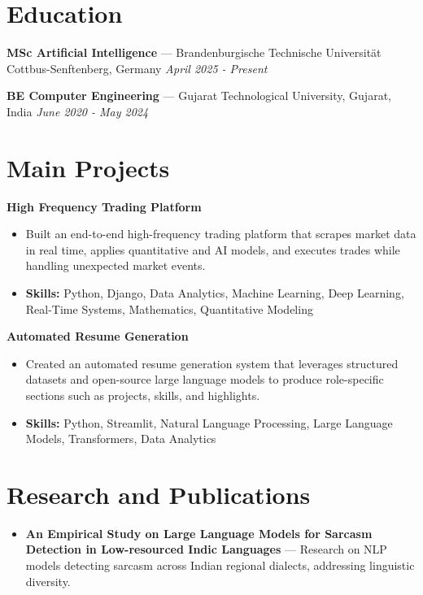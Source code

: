 \documentclass[a4paper,10pt]{article}
\begin{document}
\section*{Education}
\textbf{MSc Artificial Intelligence} — Brandenburgische Technische Universität Cottbus-Senftenberg, Germany \hfill \textit{April 2025 - Present}\par
\vspace{1.5pt}
\textbf{BE Computer Engineering} — Gujarat Technological University, Gujarat, India \hfill \textit{June 2020 - May 2024}\par

\section*{Main Projects}
\textbf{High Frequency Trading Platform}\par
\vspace{1pt}
\begin{itemize}
  \item Built an end-to-end high-frequency trading platform that scrapes market data in real time, applies quantitative and AI models, and executes trades while handling unexpected market events.
  \item \textbf{Skills:} Python, Django, Data Analytics, Machine Learning, Deep Learning, Real-Time Systems, Mathematics, Quantitative Modeling
\end{itemize}
\vspace{3pt}
\textbf{Automated Resume Generation}\par
\vspace{1pt}
\begin{itemize}
  \item Created an automated resume generation system that leverages structured datasets and open-source large language models to produce role-specific sections such as projects, skills, and highlights.
  \item \textbf{Skills:} Python, Streamlit, Natural Language Processing, Large Language Models, Transformers, Data Analytics
\end{itemize}

\section*{Research and Publications}
\begin{itemize}
\item \textbf{An Empirical Study on Large Language Models for Sarcasm Detection in Low-resourced Indic Languages} — Research on NLP models detecting sarcasm across Indian regional dialects, addressing linguistic diversity.
\end{itemize}
\end{document}
